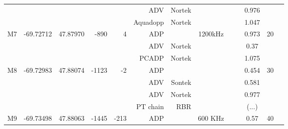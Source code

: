 \documentclass[letterpaper,10pt,landscape]{article}
\begin{document}
\begin{table}
\begin{tabular}{|r|c|c|r|r|r|r|c|c|c|c|c|c|}
    ~                   &                            &                           &                        &                       & ADV          & Nortek   &          &           &          & 0.976      &                     \\ %
    ~                   &                            &                           &                        &                       & Aquadopp     & Nortek   &          &           &          & 1.047      &                     \\\hline
    \multirow{3}{*}{M7} & \multirow{3}{*}{-69.72712} & \multirow{3}{*}{47.87970} & \multirow{3}{*}{-890}  & \multirow{3}{*}{4}    & ADP          &          & 1200kHz  &           &          & 0.973      & \multirow{3}{*}{20} \\ 
    ~                   &                            &                           &                        &                       & ADV          & Nortek   &          &           &          & 0.37       &                     \\ %
    ~                   &                            &                           &                        &                       & PCADP        & Nortek   &          &           &          & 1.075      &                     \\\hline
    \multirow{4}{*}{M8} & \multirow{4}{*}{-69.72983} & \multirow{4}{*}{47.88074} & \multirow{4}{*}{-1123} & \multirow{4}{*}{-2}   & ADP          &          &          &           &          & 0.454      & \multirow{4}{*}{30} \\ 
    ~                   &                            &                           &                        &                       & ADV          & Sontek   &          &           &          & 0.581      &                     \\ 
    ~                   &                            &                           &                        &                       & ADV          & Nortek   &          &           &          & 0.977      &                     \\ %
                        &                            &                           &                        &                       & PT chain     & RBR      &          &           &          & (...)      &                     \\\hline
    M9                  & -69.73498                  & 47.88063                  & -1445                  & -213                  & ADP          &          & 600 KHz  &           &          & 0.57       & 40                  \\\hline

\end{tabular}
\end{table}
\end{document}
